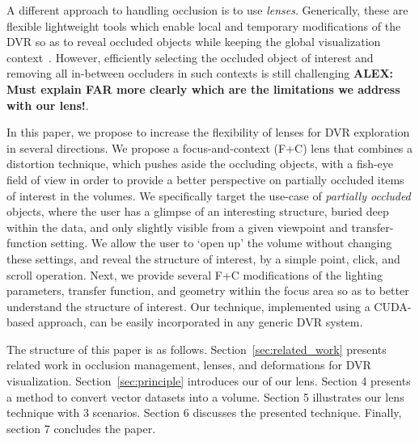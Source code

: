 A different approach to handling occlusion is to use \emph{lenses}. Generically, these are flexible lightweight tools which enable local and temporary modifications of the DVR so as to reveal occluded objects while keeping the global visualization context~\cite{595268,CGF:CGF12871,xxx}. However, efficiently selecting the occluded object of interest and removing all in-between occluders in such contexts is still challenging \textbf{ALEX: Must explain FAR more clearly which are the limitations we address with our lens!}. 

In this paper, we propose to increase the flexibility of lenses for DVR exploration in several directions. We propose a focus-and-context (F+C) lens that combines a distortion technique, which pushes aside the occluding objects, with a fish-eye field of view in order to provide a better perspective on partially occluded items of interest in the volumes. We specifically target the use-case of \emph{partially occluded} objects, where the user has a glimpse of an interesting structure, buried deep within the data, and only slightly visible from a given viewpoint and transfer-function setting. We allow the user to `open up' the volume without changing these settings, and reveal the structure of interest, by a simple point, click, and scroll operation. Next, we provide several F+C modifications of the lighting parameters, transfer function, and geometry within the focus area so as to better understand the structure of interest. Our technique, implemented using a CUDA-based approach, can be easily incorporated in any generic DVR system.
 



The structure of this paper is as follows. Section~\ref{sec:related_work} presents related work in occlusion management, lenses, and deformations for DVR visualization. Section~\ref{sec:principle} introduces our of our lens. Section 4 presents a method to convert vector datasets into a volume. Section 5 illustrates our lens technique with 3 scenarios. Section 6 discusses the presented technique. Finally, section 7 concludes the paper. 
